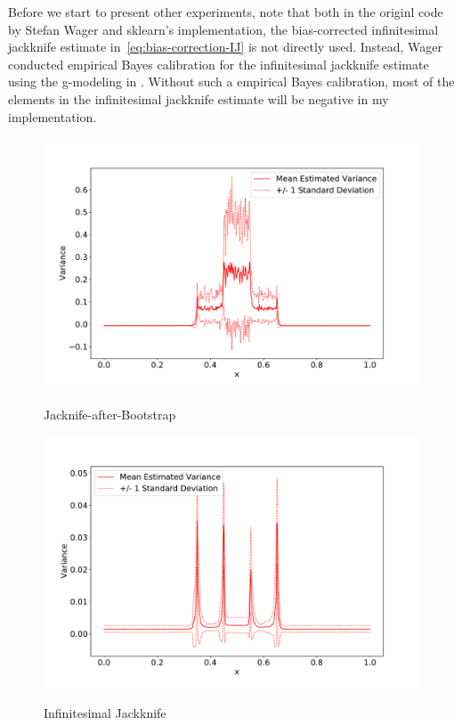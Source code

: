 \documentclass[11pt]{article}
\begin{document}
Before we start to present other experiments, note that both in the originl code by Stefan Wager and sklearn's implementation, the bias-corrected infinitesimal jackknife estimate in~\eqref{eq:bias-correction-IJ} is not directly used.
Instead, Wager conducted empirical Bayes calibration for the infinitesimal jackknife estimate using the g-modeling in \cite{efron2014two}.
Without such a empirical Bayes calibration, most of the elements in the  infinitesimal jackknife estimate will be negative in my implementation.
\begin{figure}[htbp]
	\centering
	\begin{minipage}{.5\textwidth}
	\label{lab:figeure2_J}
	\includegraphics[width=1\textwidth]{../figures/figure2_J.pdf}
	\caption{Jacknife-after-Bootstrap}
	\end{minipage}%
	\begin{minipage}{0.5\textwidth}
	\label{lab:figeure2_IJ}
	\centering	
	\includegraphics[width=1\textwidth]{../figures/figure2_IJ.pdf}
	\caption{Infinitesimal Jackknife}
	\end{minipage}
\end{figure}
\end{document}
